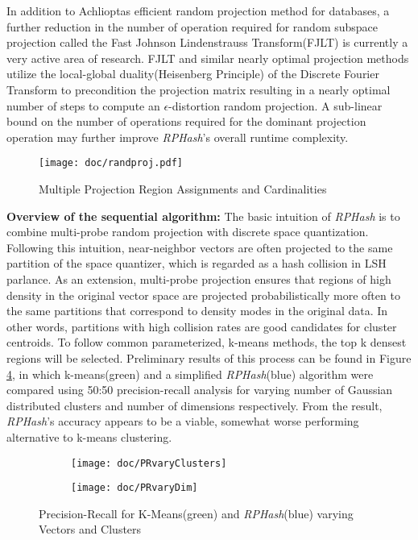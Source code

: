 \documentclass[a4paper,10pt]{article}
\begin{document}
In addition to Achlioptas efficient random projection method for
databases, a further reduction in the number of operation required
for random subspace projection called the Fast Johnson Lindenstrauss
Transform(FJLT)\cite{ailon2006,Dasgupta,ailon2013} is currently a very
active area of research.  FJLT and similar nearly optimal projection methods
utilize the local-global duality(Heisenberg Principle) of the Discrete
Fourier Transform to precondition the projection matrix resulting in a
nearly optimal number of steps to compute an $\epsilon$-distortion random
projection\cite{ailon2006,Dasgupta,ailon2013}.	A sub-linear bound on the
number of operations required for the dominant projection operation may
further improve \emph{RPHash}'s overall runtime complexity.


\begin{figure}%
\centering
\texttt{[image: doc/randproj.pdf]}
\caption{\label{randproj}Multiple Projection Region Assignments and
Cardinalities}
\end{figure}

\textbf{Overview of the sequential algorithm:} The
basic intuition of \emph{RPHash} is to combine multi-probe random projection
with discrete space quantization.  Following this intuition, near-neighbor
vectors are often projected to the same partition of the space quantizer, 
which is regarded as a hash collision in LSH parlance. As an extension, 
multi-probe projection ensures that regions of high 
density in the original vector space are projected probabilistically more 
often to the same partitions that correspond to density modes
in the original data. In other words, partitions with high collision rates
are good candidates for cluster centroids.
To follow common parameterized, k-means methods, the
top k densest regions will be selected. Preliminary results of this process
can be found in Figure \ref{praccuracy}, in which k-means(green) and a 
simplified \emph{RPHash}(blue) algorithm were compared using 50:50 
precision-recall analysis for 
varying number of Gaussian distributed clusters and number of dimensions 
respectively. From the result, \emph{RPHash}'s accuracy appears to be a viable,
somewhat worse performing alternative to k-means clustering. 
\begin{figure}
        \centering
        \begin{subfigure}[b]{0.49\textwidth}
                \texttt{[image: doc/PRvaryClusters]}
                \label{PRaccClu}
        \end{subfigure}
        \begin{subfigure}[b]{0.49\textwidth}
                \texttt{[image: doc/PRvaryDim]}
                \label{PRaccDim}
        \end{subfigure}
	 \caption{Precision-Recall for K-Means(green) and \emph{RPHash}(blue) 
              varying Vectors and Clusters}\label{praccuracy}
\end{figure}
\end{document}
